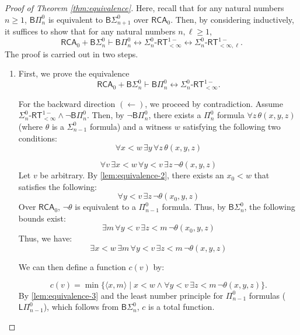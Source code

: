\documentclass[10pt,a4paper]{amsart}
\begin{document}
\begin{proof}[Proof of Theorem \ref{thm:equivalence}]
Here, recall that for any natural numbers $n \ge 1$, $\mathsf{B}\Pi_{n}^{0}$ is equivalent to $\mathsf{B}\Sigma_{n+1}^{0}$ over $\mathsf{RCA}_0$.
Then, by considering inductively, it suffices to show that for any natural numbers $n,\ell \ge 1$,
\[\mathsf{RCA}_0+\mathsf{B}\Sigma_{n}^{0}\vdash\mathsf{B}\Pi_{n}^{0}\leftrightarrow\Sigma_{n}^{0}\text{-}\mathsf{RT}_{<\infty}^{1-}\leftrightarrow\Sigma_{n}^{0}\text{-}\mathsf{RT}_{<\infty,\ell}^{1-}.
\]
The proof is carried out in two steps.


\begin{enumerate}[label=(\roman*),topsep=0.5em,itemsep=0.5em]
\item First, we prove the equivalence \[\mathsf{RCA}_0+\mathsf{B}\Sigma_{n}^{0}\vdash\mathsf{B}\Pi_{n}^{0}\leftrightarrow\Sigma_{n}^{0}\text{-}\mathsf{RT}_{<\infty}^{1-}.\]


For the backward direction $(\leftarrow)$, we proceed by contradiction. Assume $\Sigma_{n}^{0}\text{-}\mathsf{RT}_{<\infty}^{1-}\land\neg\mathsf{B}\Pi_{n}^{0}$. Then, by $\neg\mathsf{B}\Pi_{n}^{0}$, there exists a $\Pi_{n}^{0}$ formula $\forall z \, \theta(x,y,z)$ (where $\theta$ is a $\Sigma_{n-1}^{0}$ formula) and a witness $w$ satisfying the following two conditions:
\begin{equation}
\forall x < w \, \exists y \, \forall z \, \theta(x,y,z) \label{lem:equivalence-1}
\end{equation}


\begin{equation} \forall v \, \exists x < w \, \forall y < v \, \exists z \, \neg\theta(x,y,z) \label{lem:equivalence-2}
\end{equation}
Let $v$ be arbitrary. By \eqref{lem:equivalence-2}, there exists an $x_0<w$ that satisfies the following:
\[
\forall y < v \, \exists z \, \neg\theta(x_0,y,z)
\]
Over $\mathsf{RCA}_0$, $\neg\theta$ is equivalent to a $\Pi_{n-1}^{0}$ formula. Thus, by $\mathsf{B}\Sigma_{n}^{0}$, the following bounds exist:
\[
\exists m \, \forall y < v \, \exists z < m \, \neg\theta(x_0,y,z)
\]
Thus, we have:
\begin{equation} \exists x < w \, \exists m \, \forall y < v \, \exists z < m \, \neg\theta(x,y,z) \label{lem:equivalence-3}
\end{equation}


We can then define a function $c(v)$ by:


\begin{equation} c(v)=\min\{ \langle x,m \rangle \mid x < w \land \forall y < v \, \exists z < m \, \neg\theta(x,y,z) \}.
\end{equation}
By \eqref{lem:equivalence-3} and the least number principle for $\Pi_{n-1}^{0}$ formulas ($\mathsf{L}\Pi_{n-1}^{0}$), which follows from $\mathsf{B}\Sigma_{n}^{0}$, $c$ is a total function.



\end{enumerate}
\end{proof}
\end{document}

